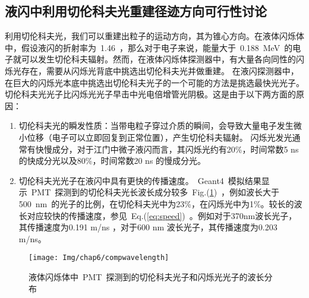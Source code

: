 \subsection{液闪中利用切伦科夫光重建径迹方向可行性讨论}
利用切伦科夫光，我们可以重建出粒子的运动方向，其为锥心方向。在液体闪烁体中，假设液闪的折射率为~1.46~，那么对于电子来说，能量大于~0.188~MeV~的电子就可以发生切伦科夫辐射。然而，在液体闪烁体探测器中，有大量各向同性的闪烁光存在，需要从闪烁光背底中挑选出切伦科夫光并做重建。
在液闪探测器中，在巨大的闪烁光本底中挑选出切伦科夫光子的一个可能的方法是挑选最快光光子。切伦科夫光光子比闪烁光光子早击中光电倍增管光阴极。这是由于以下两方面的原因：
\begin{enumerate}
\item 切伦科夫光的瞬发性质：当带电粒子穿过介质的瞬间，会导致大量电子发生微小位移（电子可以立即回复到正常位置），产生切伦科夫辐射\citep{jelley1955cerenkov}。 闪烁光发光通常有快慢成分，对于江门中微子液闪而言，其闪烁光约有20\%，时间常数5 ns 的快成分光以及80\%，时间常数20 ns 的慢成分光。
\item 切伦科夫光光子在液闪中具有更快的传播速度。~Geant4~模拟结果显示~PMT~探测到的切伦科夫光长波长成分较多~Fig.(\ref{fig:compwavelength})~，例如波长大于500~nm~的光子的比例，在切伦科夫光中为23\%，在闪烁光中为1\%。较长的波长对应较快的传播速度，参见~Eq.(\ref{eq:speed})~。例如对于370nm波长光子，其传播速度为0.191 m/ns ，对于600 nm 波长光子，其传播速度为0.203 m/ns。
\end{enumerate}
\begin{figure}[!htb]
  \centering
   \texttt{[image: Img/chap6/compwavelength]}
    \caption{液体闪烁体中~PMT~探测到的切伦科夫光子和闪烁光光子的波长分布}
  \label{fig:compwavelength}
\end{figure}

